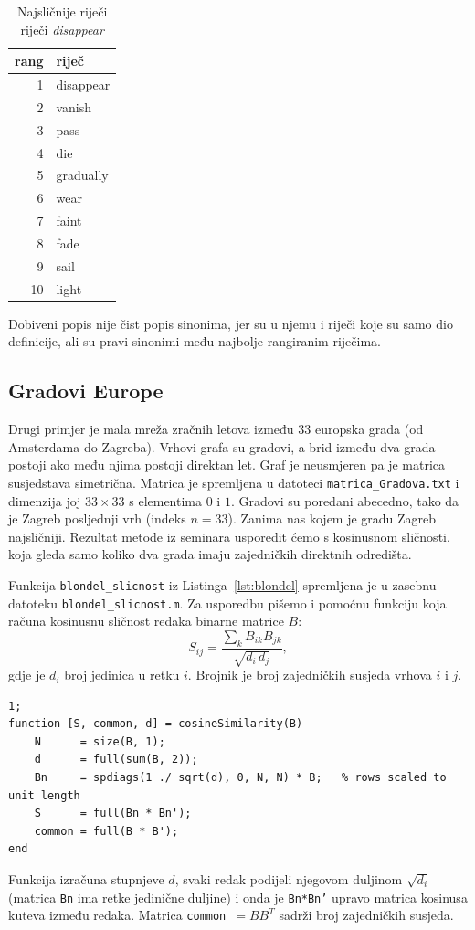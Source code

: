 \documentclass[12pt, letterpaper]{article}
\numberwithin{figure}{section}
\begin{document}
\begin{table}[H]
    \centering
    \caption{Najsličnije riječi riječi \emph{disappear}}
    \label{tab:rj_disappear}
    \begin{tabular}{rl}
        \toprule
        rang & riječ \\
        \midrule
        1  & disappear \\
        2  & vanish \\
        3  & pass \\
        4  & die \\
        5  & gradually \\
        6  & wear \\
        7  & faint \\
        8  & fade \\
        9  & sail \\
        10 & light \\
        \bottomrule
    \end{tabular}
\end{table}
Dobiveni popis nije čist popis sinonima, jer su u njemu i riječi koje su samo dio definicije, ali su pravi sinonimi među najbolje rangiranim riječima.

\subsection{Gradovi Europe}

Drugi primjer je mala mreža zračnih letova između $33$ europska grada (od Amsterdama do Zagreba). Vrhovi grafa su gradovi, a brid između dva grada postoji ako među njima postoji direktan let. Graf je neusmjeren pa je matrica susjedstava simetrična. Matrica je spremljena u datoteci \texttt{matrica\_Gradova.txt} i dimenzija joj  $33\times 33$ s elementima $0$ i $1$. Gradovi su poredani abecedno, tako da je Zagreb posljednji vrh (indeks $n=33$). Zanima nas kojem je gradu Zagreb najsličniji. Rezultat metode iz seminara usporedit ćemo s kosinusnom sličnosti, koja gleda samo koliko dva grada imaju zajedničkih direktnih odredišta.

Funkcija \texttt{blondel\_slicnost} iz Listinga~\ref{lst:blondel} spremljena je u zasebnu datoteku \texttt{blondel\_slicnost.m}. Za usporedbu pišemo i pomoćnu funkciju koja računa kosinusnu sličnost redaka binarne matrice $B$:
\[
S_{ij} = \frac{\sum_k B_{ik}B_{jk}}{\sqrt{d_i\, d_j}},
\]
gdje je $d_i$ broj jedinica u retku $i$. Brojnik je broj zajedničkih susjeda vrhova $i$ i $j$.

\begin{lstlisting}[style=octave, caption={Pomoćna funkcija za kosinusnu sličnost}, label={lst:cos_gradovi}]
1;
function [S, common, d] = cosineSimilarity(B)
    N      = size(B, 1);
    d      = full(sum(B, 2));
    Bn     = spdiags(1 ./ sqrt(d), 0, N, N) * B;   % rows scaled to unit length
    S      = full(Bn * Bn');
    common = full(B * B');
end
\end{lstlisting}
Funkcija izračuna stupnjeve $d$, svaki redak podijeli njegovom duljinom $\sqrt{d_i}$ (matrica \texttt{Bn} ima retke jedinične duljine) i onda je \texttt{Bn*Bn'} upravo matrica kosinusa kuteva između redaka. Matrica \texttt{common} \,$= BB^T$ sadrži broj zajedničkih susjeda.
\end{document}
